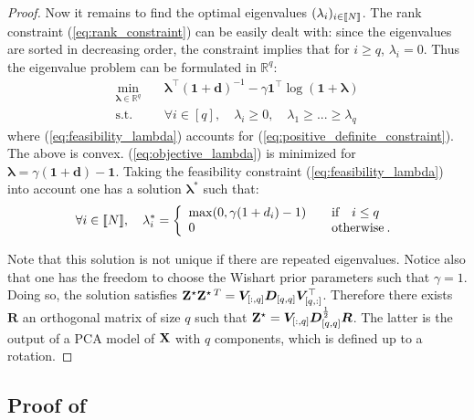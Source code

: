 \begin{proof}
Now it remains to find the optimal eigenvalues $(\lambda_i)_{i \in {[\![N]\!]}}$. The rank constraint (\ref{eq:rank_constraint}) can be easily dealt with: since the eigenvalues are sorted in decreasing order, the constraint implies that for $i \geq q$, $\lambda_i=0$.  Thus the eigenvalue problem can be formulated in $\mathbb{R}^q$:
\begin{align}
    \min_{\bm{\lambda} \in \mathbb{R}^q} \quad & \bm{\lambda}^\top (\bm{1} + \bm{d})^{-1} - \gamma \bm{1}^\top \log (\bm{1} + \bm{\lambda}) \label{eq:objective_lambda}\\
    \textrm{s.t.} \quad & \forall i \in [q], \quad  \lambda_i \geq 0 , \quad \lambda_1 \geq ... \geq \lambda_q \label{eq:feasibility_lambda}
\end{align}
where (\ref{eq:feasibility_lambda}) accounts for (\ref{eq:positive_definite_constraint}). The above is convex. (\ref{eq:objective_lambda}) is minimized for $\bm{\lambda} = \gamma (\bm{1} + \bm{d}) - \bm{1}$. Taking the feasibility constraint (\ref{eq:feasibility_lambda}) into account one has a solution $\bm{\lambda}^*$ such that:
$$\forall i \in {[\![N]\!]}, \quad 
\lambda_i^* = \left\{
    \begin{array}{ll}
        \max(0, \gamma(1 + d_i) - 1) \quad &\mbox{if} \quad i \leq q \\
        0 \quad &\mbox{otherwise} \:.
    \end{array}
\right. $$

Note that this solution is not unique if there are repeated eigenvalues. Notice also that one has the freedom to choose the Wishart prior parameters such that $\gamma=1$. Doing so, the solution satisfies $\mathbf{Z}^\star \mathbf{Z}^{\star \:T} = \bm{V}_{[:,q]} \bm{D}_{[q,q]} \bm{V}^\top_{[q,:]}$. Therefore there exists $\bm{R}$ an orthogonal matrix of size $q$ such that $\mathbf{Z}^{\star} = \bm{V}_{[:,q]}\bm{D}_{[q,q]}^{\frac{1}{2}}\bm{R}$. The latter is the output of a PCA model of $\mathbf{X}$ with $q$ components, which is defined up to a rotation.
\end{proof}

\subsection{Proof of } \label{proof:lambda_perp_integrability}

\integrabilitypairwiseMRF*


